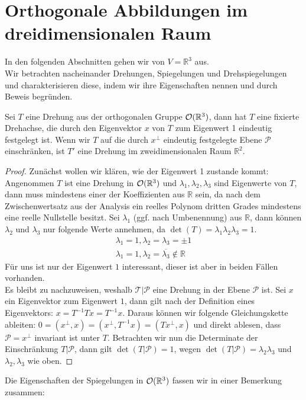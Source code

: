 \section{Orthogonale Abbildungen im dreidimensionalen Raum}
In den folgenden Abschnitten gehen wir von $V= \mathbb{R}^3$ aus.\\
Wir betrachten nacheinander Drehungen, Spiegelungen und Drehspiegelungen und charakterisieren diese, indem wir ihre Eigenschaften nennen und durch Beweis begründen. 
\begin{theorem}
Sei $T$ eine Drehung aus der orthogonalen Gruppe ${\mathcal{O}(\mathbb{R}^3)}$, dann hat $T$ eine fixierte Drehachse, die durch den Eigenvektor $x$ von $T$ zum Eigenwert 1 eindeutig festgelegt ist. 
Wenn wir $T$ auf die durch $x^{\perp}$ eindeutig festgelegte Ebene $\mathcal{P}$ einschränken, ist $T'$ eine Drehung im zweidimensionalen Raum $\mathbb{R}^2$. 
\end{theorem}
\begin{proof}
Zunächst wollen wir klären, wie der Eigenwert 1 zustande kommt:
 Angenommen $T$ ist eine Drehung in ${\mathcal{O}(\mathbb{R}^3)}$ und $\lambda_1,\lambda_2,\lambda_3$ sind Eigenwerte von $T$, dann muss mindestens einer der Koeffizienten aus $\mathbb{R}$ sein, da nach dem Zwischenwertsatz aus der Analysis ein reelles Polynom dritten Grades mindestens eine reelle Nullstelle besitzt. Sei $\lambda_1$ (ggf. nach Umbenennung) aus $\mathbb{R}$, dann können $\lambda_2$ und $\lambda_3$ nur folgende Werte annehmen, da $\det(T)=\lambda_1\lambda_2\lambda_3=1$.
 \begin{align}
  \lambda_1=1, \lambda_2=\lambda_3=\pm1 \\
  \lambda_1=1, \lambda_2=\overline{\lambda_3}\notin \mathbb{R}
 \end{align}
Für uns ist nur der Eigenwert $1$ interessant, dieser ist aber in beiden Fällen vorhanden.\\
Es bleibt zu nachzuweisen, weshalb $\mathcal{T}|\mathcal{P}$ eine Drehung in der Ebene $\mathcal{P}$ ist.
Sei $x$ ein Eigenvektor zum Eigenwert $1$, dann gilt nach der Definition eines Eigenvektors: $x=T^{-1}Tx=T^{-1}x$. Daraus können wir folgende Gleichungskette ableiten: $0=(x^{\perp},x)=(x^{\perp},T^{-1}x)=(Tx^{\perp},x)$ und direkt ablesen, dass $\mathcal{P}=x^{\perp}$ invariant ist unter $T$. Betrachten wir nun die Determinate der Einschränkung $T|\mathcal{P}$, dann gilt $\det(T|\mathcal{P})=1$, wegen $\det(T|\mathcal{P}) = \lambda_2\lambda_3$ und $\lambda_2,\lambda_3$ wie oben.
\end{proof}
Die Eigenschaften der Spiegelungen in ${\mathcal{O}(\mathbb{R}^3)}$ fassen wir in einer Bemerkung zusammen:
